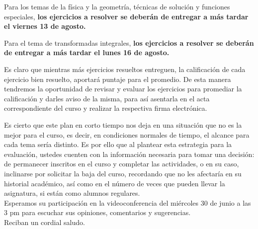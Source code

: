 Para los temas de la física y la geometría, técnicas de solución y funciones especiales, \textbf{los ejercicios a resolver se deberán de entregar a más tardar el viernes 13 de agosto.}
\par
Para el tema de transformadas integrales, \textbf{los ejercicios a resolver se deberán de entregar a más tardar el lunes 16 de agosto.}
\par
Es claro que mientras más ejercicios resueltos entreguen, la calificación de cada ejercicio bien resuelto, aportará puntaje para el promedio. De esta manera tendremos la oportunidad de revisar y evaluar los ejercicios para promediar la calificación y darles aviso de la misma, para así asentarla en el acta correspondiente del curso y realizar la respectiva firma electrónica.
\par
Es cierto que este plan en corto tiempo nos deja en una situación que no es la mejor para el curso, es decir, en condiciones normales de tiempo, el alcance para cada tema sería distinto. Es por ello que al plantear esta estrategia para la evaluación, ustedes cuenten con la información necesaria para tomar una decisión: de permanecer inscritos en el curso y completar las actividades, o en su caso, inclinarse por solicitar la baja del curso, recordando que no les afectaría en su historial académico, así como en el número de veces que pueden llevar la asignatura, si están como alumnos regulares. 
\\[0.5em]
Esperamos su participación en la videoconferencia del miércoles 30 de junio a las 3 pm para escuchar sus opiniones, comentarios y sugerencias.
\\[1.5em]
Reciban un cordial saludo.



